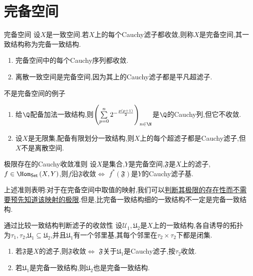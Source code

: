 \section{完备空间}

\begin{definition}{完备空间}{}
	设$X$是一致空间.若$X$上的每个Cauchy滤子都收敛,则称$X$是完备空间,其一致结构称为完备一致结构.
\end{definition}

\begin{remark}{}{}
	\begin{enumerate}
		\item 完备空间中的每个Cauchy序列都收敛.
		\item 离散一致空间是完备空间,因为其上的Cauchy滤子都是平凡超滤子.
	\end{enumerate}
\end{remark}

\begin{example}{不是完备空间的例子}{}
	\begin{enumerate}
		\item 给$\Q$配备加法一致结构,则$\left(\sum\limits_{p=0}^{n}2^{-\frac{p\left(p+1\right)}{2}}\right)_{n\in\N}$是$\Q$的Cauchy列,但它不收敛.
		\item 设$X$是无限集,配备有限划分一致结构,则$X$上的每个超滤子都是Cauchy滤子,但$X$不是离散空间.
	\end{enumerate}
\end{example}

\begin{proposition}{极限存在的Cauchy收敛准则}{}
	设$X$是集合,$Y$是完备空间,$\mathfrak{F}$是$X$上的滤子,$f\in\Hom_{\mathsf{Set}}\left(X,Y\right)$,则$f$沿$\mathfrak{F}$收敛$\iff$ $f^{\ast}\left(\mathfrak{F}\right)$是$Y$的Cauchy滤子基.
\end{proposition}

\begin{remark}{}{}
	上述准则表明:对于在完备空间中取值的映射,我们可以\underline{判断其极限的存在性而不需要预先知道该映射的极限}.但是,比完备一致结构细的一致结构不一定是完备一致结构.
\end{remark}

\begin{proposition}{通过比较一致结构判断滤子的收敛性}{}
	设$\mathcal{U}_{1},\mathfrak{U}_{2}$是$X$上的一致结构,各自诱导的拓扑为$\tau_{1},\tau_{2}$,$\mathfrak{U}_{1}\subseteq\mathfrak{U}_{2}$,并且$\mathfrak{U}_{1}$有一个邻里基,其每个邻里在$\tau_{2}\times\tau_{2}$下都是闭集.
	\begin{enumerate}
		\item 若$\mathfrak{F}$是$X$的滤子,则$\mathfrak{F}$收敛$\iff$ $\mathfrak{F}$关于$\mathfrak{U}_{1}$是Cauchy滤子,按$\tau_{2}$收敛.
		\item 若$\mathfrak{U}_{1}$是完备一致结构,则$\mathfrak{U}_{2}$也是完备一致结构.
	\end{enumerate}
\end{proposition}
